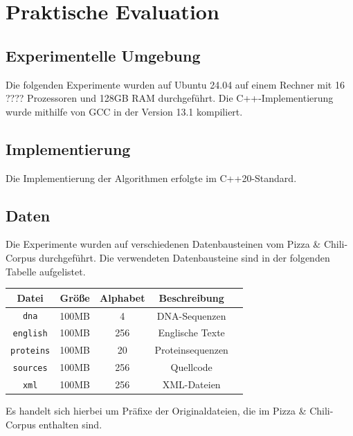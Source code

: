 \chapter{Praktische Evaluation}

\section{Experimentelle Umgebung}
Die folgenden Experimente wurden auf Ubuntu 24.04 auf einem Rechner mit 16 ???? Prozessoren und 128GB RAM durchgeführt. Die C++-Implementierung wurde
mithilfe von GCC in der Version 13.1 kompiliert.

\section{Implementierung}
Die Implementierung der Algorithmen erfolgte im C++20-Standard.

\section{Daten}
Die Experimente wurden auf verschiedenen Datenbausteinen vom Pizza \& Chili-Corpus durchgeführt. Die verwendeten Datenbausteine sind in der folgenden Tabelle aufgelistet.

\begin{center}
    \begin{tabular}{|c|c|c|c|c|}
        \hline
        \textbf{Datei} & \textbf{Größe} & \textbf{Alphabet} & \textbf{Beschreibung} \\
        \hline
        \hline
        \texttt{dna} & 100MB & 4 & DNA-Sequenzen \\
        \hline
        \texttt{english} & 100MB & 256 & Englische Texte \\
        \hline
        \texttt{proteins} & 100MB & 20 & Proteinsequenzen \\
        \hline
        \texttt{sources} & 100MB & 256 & Quellcode \\
        \hline
        \texttt{xml} & 100MB & 256 & XML-Dateien \\
        \hline
    \end{tabular}
\end{center}
Es handelt sich hierbei um Präfixe der Originaldateien, die im Pizza \& Chili-Corpus enthalten sind.

